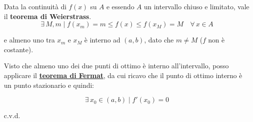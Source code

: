 \documentclass[../dimostrazioni]{subfiles}
\begin{document}
            Data la continuità di \(f(x)\) su \(A\) e essendo \(A\) un intervallo chiuso e limitato, vale il \textbf{teorema di Weierstrass}.
            \[ \exists \, M, m \; | \; f(x_m)=m \leqslant f(x) \leqslant f(x_M) = M \quad \forall \, x \in A \]

            e almeno uno tra \(x_m\) e \(x_M\) è interno ad \( (a,b) \), dato che \( m \neq M \) (\( f \) non è costante).

            Visto che almeno uno dei due punti di ottimo è interno all'intervallo, posso applicare il \textbf{\hyperref[teoFermat]{teorema di Fermat}}, da cui ricavo che il punto di ottimo interno è un punto stazionario e quindi:

            \[\exists \, x_0 \in (a,b) \; | \; f'(x_0) = 0 \]
            
            c.v.d.

    
\end{document}
